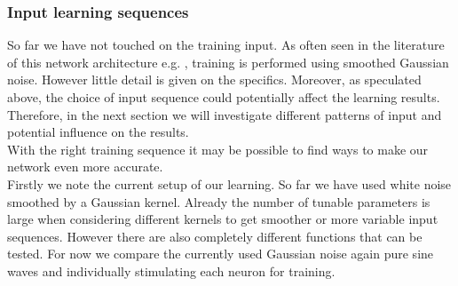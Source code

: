 \subsubsection{Input learning sequences}
So far we have not touched on the training input. As often seen in the literature of this network architecture e.g. \cite{brendel_learning_2020,alemi_learning_2017,vertechi_unsupervised_2014,bourdoukan_enforcing_2015}, training is performed using smoothed Gaussian noise. However little detail is given on the specifics. Moreover, as speculated above, the choice of input sequence could potentially affect the learning results.
Therefore, in the next section we will investigate different patterns of input and potential influence on the results.\\
With the right training sequence it may be possible to find ways to make our network even more accurate.\\
Firstly we note the current setup of our learning. So far we have used white noise smoothed by a Gaussian kernel. Already the number of tunable parameters is large when considering different kernels to get smoother or more variable input sequences. However there are also completely different functions that can be tested. For now we compare the currently used Gaussian noise again pure sine waves and individually stimulating each neuron for training.\\
